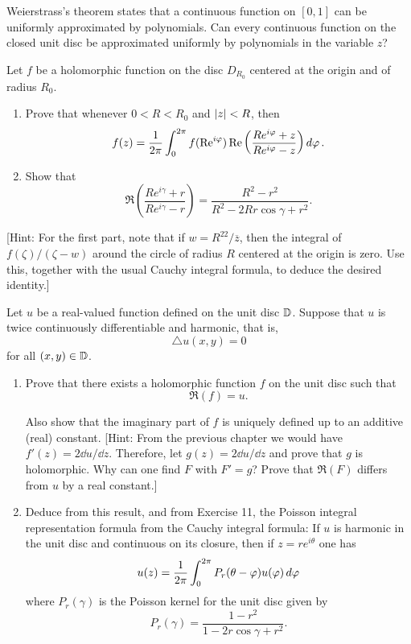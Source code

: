 \begin{exercise}
Weierstrass's theorem states that a continuous function on $[0, 1]$ can be uniformly approximated by polynomials. Can every continuous function on the closed
unit disc be approximated uniformly by polynomials in the variable $z$?
\end{exercise}

\begin{exercise}
Let $f$ be a holomorphic function on the disc $D_{R_0}$ centered at the origin and
of radius $R_0$.

\begin{enumerate}[label=(\alph*)]
\item Prove that whenever $0<R<R_0$ and $\left\lvert z \right\rvert < R$, then $$f(z)=\frac{1}{2\pi} \int_0^{2\pi} f(\operatorname{Re}^{i\varphi})\operatorname{Re}\left(\frac{Re^{i\varphi}+z}{Re^{i\varphi}-z}\right) \mathop{d{\varphi}}.$$
\item Show that $$\Re\left(\frac{Re^{i\gamma}+r}{Re^{i\gamma}-r}\right) = \frac{R^2-r^2}{R^2-2Rr\cos{\gamma}+r^2}.$$
\end{enumerate}
[Hint: For the first part, note that if $w = R^22/\overline{z}$, then the integral of $f(\zeta)/(\zeta - w)$ around the circle of radius $R$ centered at the origin is zero. Use this, together with
the usual Cauchy integral formula, to deduce the desired identity.]
\end{exercise}

\begin{exercise}
Let $u$ be a real-valued function defined on the unit disc $\mathbb{D}$. Suppose that $u$ is
twice continuously differentiable and harmonic, that is, $$\triangle u(x,y)=0$$ for all $(x,y)\in\mathbb{D}$.
\begin{enumerate}[label=(\alph*)]
\item Prove that there exists a holomorphic function $f$ on the unit disc such that $$\Re(f)=u.$$

Also show that the imaginary part of $f$ is uniquely defined up to an additive
(real) constant. [Hint: From the previous chapter we would have $f'(z)=2\dd{u}/\dd{z}$. Therefore, let $g(z)=2\dd{u}/\dd{z}$ and prove that $g$ is holomorphic. Why can one find $F$ with $F'=g$? Prove that $
\Re(F)$ differs from $u$ by a real constant.]
\item Deduce from this result, and from Exercise 11, the Poisson integral representation formula from the Cauchy integral formula: If $u$ is harmonic in the unit disc and continuous on its closure, then if $z = re^{i\theta}$ one has $$u(z)=\frac{1}{2\pi}\int_0^{2\pi} P_r(\theta-\varphi)u(\varphi)\mathop{d{\varphi}}$$ where $P_r(\gamma)$ is the Poisson kernel for the unit disc given by $$P_r(\gamma) = \frac{1-r^2}{1-2r\cos{\gamma}+r^2}.$$
\end{enumerate}
\end{exercise}

